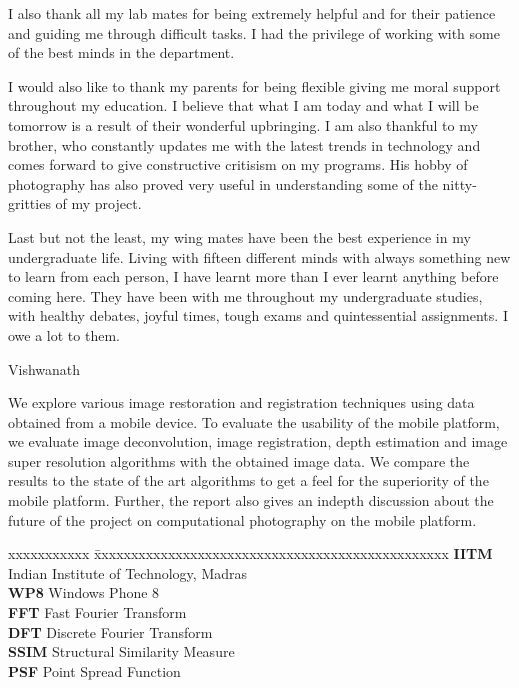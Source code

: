 \documentclass[BTech]{iitmdiss}
\begin{document}
I also thank all my lab mates for being extremely helpful and
for their patience and guiding me through difficult tasks. I had the
privilege of working with some of the best minds in the department.

I would also like to thank my parents for being flexible giving me moral
support throughout my education. I believe that what I am today and what
I will be tomorrow is a result of their wonderful upbringing. I  am also
thankful to my brother, who constantly updates me with the latest trends
in technology and comes forward to give constructive critisism on my
programs. His hobby of photography has also proved very useful in 
understanding some of the nitty-gritties of my project.

Last but not the least, my wing mates have been the best 
experience in my undergraduate life. Living with fifteen different minds
with always something new to learn from each person, I have learnt more
than I ever learnt anything before coming here. They have been with me
throughout my undergraduate studies, with healthy debates, joyful times,
tough exams and quintessential assignments. I owe a lot to them.

\raggedright{Vishwanath}

\abstract
We explore various image restoration and registration techniques using 
data obtained from a mobile device. To evaluate the usability of the 
mobile platform, we evaluate image deconvolution, image registration,
depth estimation and image super resolution algorithms with the obtained
image data. We compare the results to the state of the art algorithms
to get a feel for the superiority of the mobile platform. Further, the
report also gives an indepth discussion about the future of the project
on computational photography on the mobile platform.

\begin{singlespace}
\tableofcontents
\thispagestyle{empty}

\listoftables
{}
\listoffigures
{}
\end{singlespace}
\pagebreak

\abbreviations

\noindent 
\begin{tabbing}
xxxxxxxxxxx \= xxxxxxxxxxxxxxxxxxxxxxxxxxxxxxxxxxxxxxxxxxxxxxxx \kill
\textbf{IITM}   \> Indian Institute of Technology, Madras \\
\textbf{WP8}    \> Windows Phone 8 \\
\textbf{FFT}    \> Fast Fourier Transform \\
\textbf{DFT}    \> Discrete Fourier Transform \\
\textbf{SSIM}   \> Structural Similarity Measure \\
\textbf{PSF}   \> Point Spread Function \\
\end{tabbing}
\end{document}
